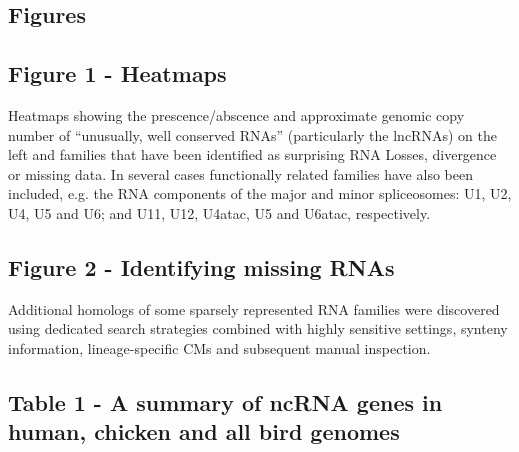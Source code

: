 \documentclass[10pt]{bmc_article}
\newenvironment{bmcformat}{\begin{raggedright}\baselineskip20pt\sloppy\setboolean{publ}{false}}{\end{raggedright}\baselineskip20pt\sloppy}
\begin{document}
\begin{bmcformat}
\clearpage
\newpage

\section*{Figures}
  \subsection*{Figure 1 - Heatmaps}

Heatmaps showing the prescence/abscence and approximate genomic copy
number of ``unusually, well conserved RNAs'' (particularly the
lncRNAs) on the left and families that have been identified as
surprising RNA Losses, divergence or missing data. In several cases
functionally related families have also been included, e.g. the RNA
components of the major and minor spliceosomes: U1, U2, U4, U5 and U6;
and U11, U12, U4atac, U5 and U6atac, respectively.\label{fig:1}


  \subsection*{Figure 2 - Identifying missing RNAs}

Additional homologs of some sparsely represented RNA families were
discovered using dedicated search strategies combined with highly
sensitive settings, synteny information, lineage-specific CMs and
subsequent manual inspection.\label{fig:2}


  \subsection*{Table 1 - A summary of ncRNA genes in human, chicken and all bird genomes}


\end{bmcformat}
\end{document}
